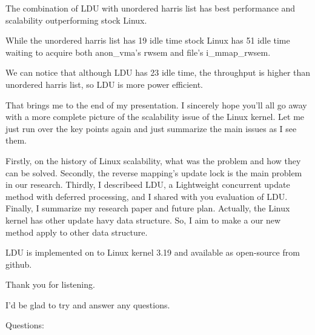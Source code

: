 The combination of LDU with unordered harris list has best performance and
scalability outperforming stock Linux.

While the unordered harris list has 19 idle time stock Linux has 51 idle time
 waiting to acquire both anon_vma's rwsem and file's i_mmap_rwsem.

We can notice that although LDU has 23 idle time, the throughput is higher
than unordered harris list, so LDU is more power efficient.


That brings me to the end of my presentation. 
I sincerely hope you'll all go away with a more complete picture of the
scalability issue of the Linux kernel.
Let me just run over the key points again and just summarize the main issues as
I see them.

Firstly, on the history of Linux scalability, what was the problem and how
they can be solved.
Secondly, the reverse mapping's update lock is the main problem in our research.
Thirdly, I describeed LDU, a Lightweight concurrent update
method with deferred processing, and I shared with you evaluation of LDU.
Finally, I summarize my research paper and future plan. 
Actually, the Linux kernel has other update havy data structure.
So, I aim to make a our new method apply to other data structure.

LDU is implemented on to Linux kernel 3.19 and available as open-source from
github.

Thank you for listening.

I'd be glad to try and answer any questions. 

Questions:

